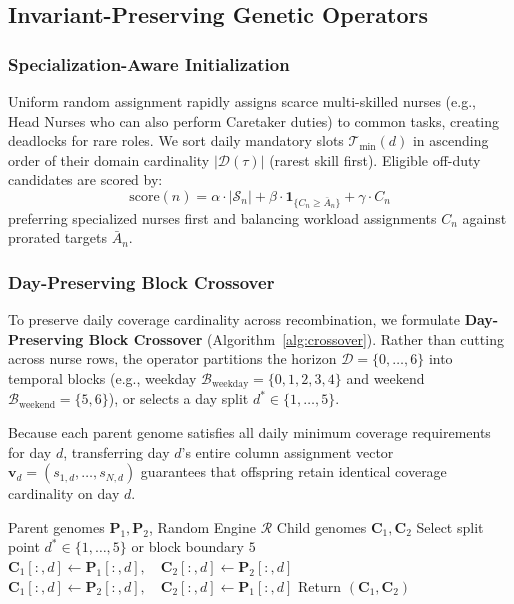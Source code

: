 \documentclass[10pt,journal,compsoc]{IEEEtran}
\begin{document}
\subsection{Invariant-Preserving Genetic Operators}

\subsubsection{Specialization-Aware Initialization}
Uniform random assignment rapidly assigns scarce multi-skilled nurses (e.g., Head Nurses who can also perform Caretaker duties) to common tasks, creating deadlocks for rare roles. We sort daily mandatory slots $\mathcal{T}_{\min}(d)$ in ascending order of their domain cardinality $|\mathcal{D}(\tau)|$ (rarest skill first). Eligible off-duty candidates are scored by:
\begin{equation}
\text{score}(n) = \alpha \cdot |\mathcal{S}_n| + \beta \cdot \mathbf{1}_{\{C_n \ge \bar{A}_n\}} + \gamma \cdot C_n
\end{equation}
preferring specialized nurses first and balancing workload assignments $C_n$ against prorated targets $\bar{A}_n$.

\subsubsection{Day-Preserving Block Crossover}
To preserve daily coverage cardinality across recombination, we formulate \textbf{Day-Preserving Block Crossover} (Algorithm~\ref{alg:crossover}). Rather than cutting across nurse rows, the operator partitions the horizon $\mathcal{D} = \{0, \dots, 6\}$ into temporal blocks (e.g., weekday $\mathcal{B}_{\text{weekday}} = \{0, 1, 2, 3, 4\}$ and weekend $\mathcal{B}_{\text{weekend}} = \{5, 6\}$), or selects a day split $d^* \in \{1, \dots, 5\}$.

Because each parent genome satisfies all daily minimum coverage requirements for day $d$, transferring day $d$'s entire column assignment vector $\mathbf{v}_d = (s_{1,d}, \dots, s_{N,d})$ guarantees that offspring retain identical coverage cardinality on day $d$.

\begin{algorithm}[t]
\caption{Day-Preserving Block Crossover}
\label{alg:crossover}
\begin{algorithmic}[1]
\REQUIRE Parent genomes $\mathbf{P}_1, \mathbf{P}_2$, Random Engine $\mathcal{R}$
\ENSURE Child genomes $\mathbf{C}_1, \mathbf{C}_2$
\STATE Select split point $d^* \in \{1, \dots, 5\}$ or block boundary $5$
        \STATE $\mathbf{C}_1[:, d] \leftarrow \mathbf{P}_1[:, d], \quad \mathbf{C}_2[:, d] \leftarrow \mathbf{P}_2[:, d]$
    \ELSE
        \STATE $\mathbf{C}_1[:, d] \leftarrow \mathbf{P}_2[:, d], \quad \mathbf{C}_2[:, d] \leftarrow \mathbf{P}_1[:, d]$
    \ENDIF
\ENDFOR
\STATE Return $(\mathbf{C}_1, \mathbf{C}_2)$
\end{algorithmic}
\end{algorithm}
\end{document}
